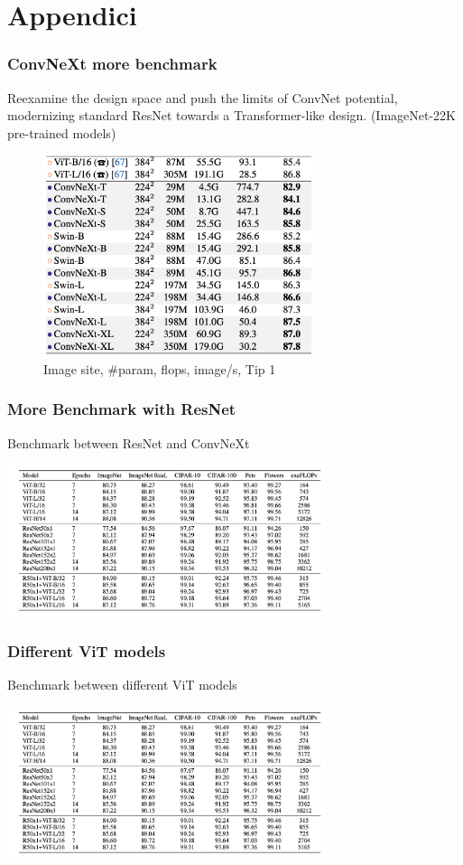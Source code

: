 \section{Appendici}

\begin{frame}
\frametitle{ConvNeXt more benchmark}
Reexamine the design space and push the limits of ConvNet potential, modernizing  standard ResNet towards a Transformer-like design.
(ImageNet-22K pre-trained models)


\begin{figure}[h]
    \centering
    \includegraphics[width=0.7\textwidth]{img/4-section/ConvNext2.png}
    \caption{Image site, #param, flops, image/s, Tip 1}
\end{figure}

\end{frame}


\begin{frame}
\frametitle{More Benchmark with ResNet}
Benchmark between ResNet and ConvNeXt
\begin{center}
    \includegraphics[width=0.7\textwidth]{img/4-section/More-benchmark.png}
\end{center}

\end{frame}

\begin{frame}
\frametitle{Different ViT models}
Benchmark between different ViT models
\begin{center}
    \includegraphics[width=0.7\textwidth]{img/4-section/More-benchmark.png}
\end{center}

\end{frame}


